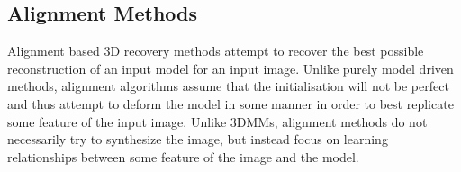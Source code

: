 \subsection{Alignment Methods}\label{subsec:bg_model_based_alignment}
Alignment based 3D recovery methods attempt to recover the best possible
reconstruction of an input model for an input image. Unlike purely model
driven methods, alignment algorithms assume that the initialisation will not be
perfect and thus attempt to deform the model in some manner in order to best
replicate some feature of the input image. Unlike 3DMMs, alignment methods
do not necessarily try to synthesize the image, but instead focus on learning
relationships between some feature of the image and the model.

